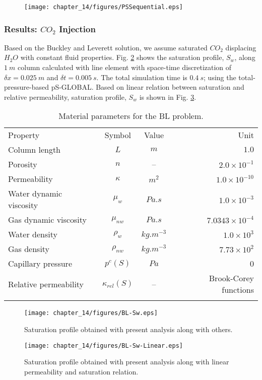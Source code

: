 \begin{figure}[!thb]
\begin{center}
\texttt{[image: chapter\_14/figures/PSSequential.eps]}
\end{center}
\vspace{-5.0cm}
\caption{}
\label{bls:comparison}
\end{figure}

\subsubsection*{Results: $CO_2$ Injection}
Based on the Buckley and Leverett solution, we assume saturated $CO_2$ displacing $H_2O$ with constant fluid properties. Fig. \ref{bl:comparison} shows the saturation profile, $S_w$, along $1~m$ column calculated with line element with space-time discretization of $\delta x = 0.025~m$ and $\delta t = 0.005~s$. The total simulation time is $0.4~s$; using the total-pressure-based pS-GLOBAL. Based on linear relation between saturation and relative permeability, saturation profile, $S_w$ is shown in Fig. \ref{bl:comparison2}.

\begin{table}[!htb]
\begin{tabular}{lccr}
\hline\hline\noalign{\smallskip}
Property & Symbol & Value & Unit \\
\noalign{\smallskip}\hline\noalign{\smallskip}
Column length & $L$ & $m$ & $1.0$  \\
Porosity & $n$ & -- & $2.0\times10^{-1}$ \\
Permeability & $\kappa$ & $ m^2$ & $1.0\times 10^{-10}$ \\
Water dynamic viscosity &  $\mu_w$ & $Pa.s$ & $1.0\times10^{-3}$ \\
Gas dynamic viscosity & $\mu_{nw}$ & $Pa.s$ & $7.0343\times10^{-4}$ \\
Water density &  $\rho_w$ &$kg.m^{-3}$ & $1.0\times10^{3}$ \\
Gas density &  $\rho_{nw}$ & $kg.m^{-3}$ & $7.73\times10^{2}$ \\
Capillary pressure & $p^c(S)$ & $Pa$ & 0 \\
Relative permeability & $\kappa_{rel}(S)$ & -- & Brook-Corey functions \\
\noalign{\smallskip}\hline\hline
\end{tabular}
\caption{Material parameters for the BL problem.}
\end{table}

\begin{figure}[!thb]
\begin{center}
\texttt{[image: chapter\_14/figures/BL-Sw.eps]}
\end{center}
\caption{Saturation profile obtained with present analysis along with others.}
\label{bl:comparison}
\end{figure}

\begin{figure}[!thb]
\begin{center}
\texttt{[image: chapter\_14/figures/BL-Sw-Linear.eps]}
\end{center}
\caption{Saturation profile obtained with present analysis along with linear permeability and saturation relation.}
\label{bl:comparison2}
\end{figure}
